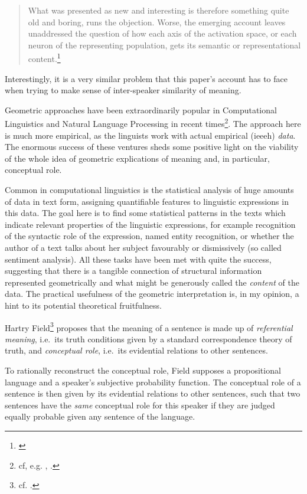 \documentclass[11pt, a4paper]{scrartcl}
\renewcommand{\i}[1]{\emph{#1}}
\begin{document}
{\singlespacing{} 
\begin{quote}What was presented as new and interesting is therefore something quite old and boring, runs the objection. Worse, the emerging account leaves unaddressed the question of how each axis of the activation space, or each neuron of the representing population, gets its semantic or representational content.\footnote{\textcite[7]{10.2307/2564566}}
 \end{quote}
}
 Interestingly, it is a very similar problem that this paper's account has to face when trying to make sense of inter-speaker similarity of meaning.

Geometric approaches have been extraordinarily popular in Computational Linguistics and Natural Language Processing in recent times\footnote{cf, e.g. \textcite{erk2008structured}, \textcite{sahlgren2006word}.}. The approach here is much more empirical, as the linguists work with actual empirical (ieeeh) \i{data}. The enormous success of these ventures sheds some positive light on the viability of the whole idea of geometric explications of meaning and, in particular, conceptual role.

Common in computational linguistics is the statistical analysis of huge amounts of data in text form, assigning quantifiable features to linguistic expressions in this data. The goal here is to find some statistical patterns in the texts which indicate relevant properties of the linguistic expressions, for example recognition of the syntactic role of the expression, named entity recognition, or whether the author of a text talks about her subject favourably or dismissively (so called sentiment analysis). All these tasks have been met with quite the success, suggesting that there is a tangible connection of structural information represented geometrically and what might be generously called the \i{content} of the data. The practical usefulness of the geometric interpretation is, in my opinion, a hint to its potential theoretical fruitfulness. 

Hartry Field\footnote{cf. \textcite{Field1977}.} proposes that the meaning of a sentence is made up of \i{referential meaning}, i.e.\ its truth conditions given by a standard correspondence theory of truth, and \i{conceptual role}, i.e.\ its evidential relations to other sentences.

To rationally reconstruct the conceptual role, Field supposes a propositional language and a speaker's subjective probability function. The conceptual role of a sentence is then given by its evidential relations to other sentences, such that two sentences have the \i{same} conceptual role for this speaker if they are judged equally probable given any sentence of the language. 
\end{document}
